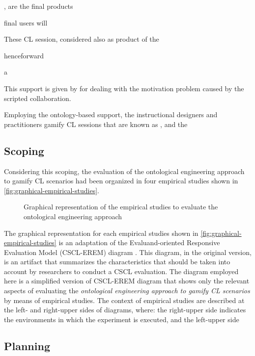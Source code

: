 ,  are the final products 

final users will 


These CL session, considered also as product of the 

henceforward 


a 

This support is given by 
for dealing with the motivation problem caused by the scripted collaboration. 

Employing the ontology-based support, the instructional designers and practitioners gamify CL sessions that are known as , and the 

\subsection{Scoping}



Considering this scoping, the evaluation of the ontological engineering approach to gamify CL scenarios had been organized in four empirical studies shown in \autoref{fig:graphical-empirical-studies}.

\begin{figure}[htb]
 \caption{Graphical representation of the empirical studies to evaluate the ontological engineering approach}
 \label{fig:graphical-empirical-studies}
 \centering
 \fautor
\end{figure}

The graphical representation for each empirical studies shown in \autoref{fig:graphical-empirical-studies} is an adaptation of the Evaluand-oriented Responsive Evaluation Model (CSCL-EREM) diagram \cite{Jorrin-AbellanStakeMartinez-Mone2009}. This diagram, in the original version, is an artifact that summarizes the characteristics that should be taken into account by researchers to conduct a CSCL evaluation. The diagram employed here is a simplified version of CSCL-EREM diagram that shows only the relevant aspects of evaluating the \emph{ontological engineering approach to gamify CL scenarios} by means of empirical studies. The context of empirical studies are described at the left- and right-upper sides of diagrams, where: the right-upper side indicates the environments in which the experiment is executed, and the left-upper side 

\subsection{Planning}

